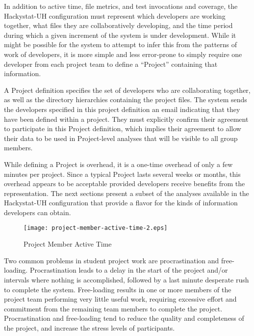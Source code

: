 \documentclass[10pt,twocolumn]{article}
\begin{document}

In addition to active time, file metrics, and test invocations and
coverage, the Hackystat-UH configuration must represent which
developers are working together, what files they are collaboratively
developing, and the time period during which a given increment of the
system is under development. While it might be possible for the system to
attempt to infer this from the patterns of work of developers, it is more
simple and less error-prone to simply require one developer from each
project team to define a ``Project'' containing that information.  

A Project definition specifies the set of developers who are
collaborating together, as well as the directory hierarchies containing the
project files.  The system sends the developers specified in this project
definition an email indicating that they have been defined within a
project. They must explicitly confirm their agreement to participate in
this Project definition, which implies their agreement to allow their data
to be used in Project-level analyses that will be visible to all group members.

While defining a Project is overhead, it is a one-time overhead of only a
few minutes per project. Since a typical Project lasts several weeks or
months, this overhead appears to be acceptable provided developers receive
benefits from the representation.  The next sections present a subset of
the analyses available in the Hackystat-UH configuration that provide a
flavor for the kinds of information developers can obtain.


\begin{figure}[ht]
  \centering
  \texttt{[image: project-member-active-time-2.eps]}
  \caption{Project Member Active Time}
  \label{fig:project-member-active-time}
\end{figure}

Two common problems in student project work are procrastination and
free-loading. Procrastination leads to a delay in the start of the project
and/or intervals where nothing is accomplished, followed by a last minute
desperate rush to complete the system.  Free-loading results in one or more
members of the project team performing very little useful work, requiring
excessive effort and commitment from the remaining team members to complete
the project.  Procrastination and free-loading tend to reduce the quality
and completeness of the project, and increase the stress levels of
participants.
\end{document}
